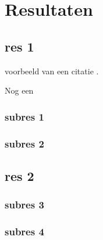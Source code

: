 \chapter{Resultaten}
\section{res 1}

voorbeeld van een citatie \cite{Vapnik1995,Broeckx2018}. \lipsum[1] \nocite{Stanley2017}\par 
Nog een\cite{Reichenbach2018} \lipsum[2]
\subsection{subres 1}
\subsection{subres 2}
\section{res 2}
\subsection{subres 3}
\subsection{subres 4}